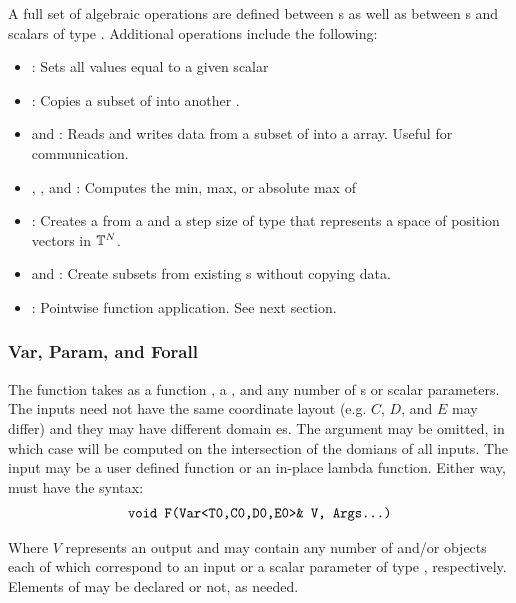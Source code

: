 \documentclass[12pt]{article}
\begin{document}
A full set of algebraic operations are defined between s as well as between s and scalars of type . Additional operations include the following:

\begin{itemize}
\item {}: Sets all values equal to a given scalar
\item {}: Copies a subset of  into another .
\item {} and : Reads and writes data from a subset of  into a  array. Useful for communication. 
\item {}, , and : Computes the min, max, or absolute max of 
\item {}: Creates a  from a  and a step size of type  that represents a space of position vectors in $\mathbb{T}^N$.
\item {} and : Create  subsets from existing s without copying data. 
\item {}: Pointwise function application. See next section.
\end{itemize}

\subsubsection{Var, Param, and Forall}

The function  takes as a function , a , and any 
number of s or scalar parameters. The  inputs need not have the same coordinate layout (e.g. $C$, $D$, and $E$ may differ) and they may have different domain es. The  argument may be omitted, in which case  will be computed on the intersection of the domians of all  inputs. The input  may be a user defined function or an in-place lambda function. Either way,  must have the syntax:
\begin{align*}
\text{\texttt{void F(Var<T0,C0,D0,E0>\& V, Args...)}}
\end{align*}

Where $V$ represents an output  and  may contain any number of  and/or  objects each of which correspond to an input  or a scalar parameter of type , respectively. Elements of  may be declared  or not, as needed.
\end{document}

